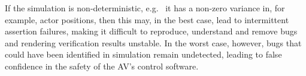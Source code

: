 \documentclass[runningheads,twocolumn,a4paper,10pt]{llncs}
\begin{document}
%
%

If the simulation is non-deterministic, e.g.\ 
it has a non-zero variance in, for example, actor positions, then this may, in the best case, lead to intermittent assertion failures, making it difficult to reproduce, understand and remove bugs and rendering verification results unstable. In the worst case, however, bugs that could have been identified in simulation remain undetected, leading to false confidence in the safety of the AV's control software. 
%

\end{document}
